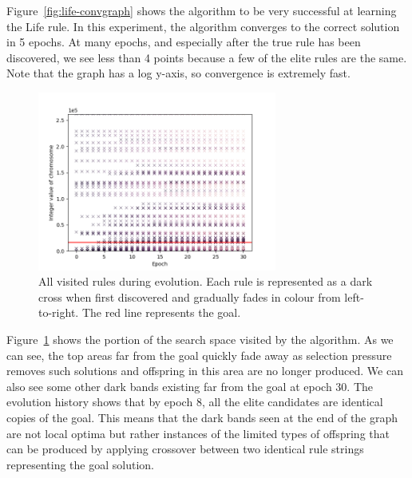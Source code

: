 Figure~\ref{fig:life-convgraph} shows the algorithm to be very successful at learning the Life rule. In this experiment, the algorithm converges to the correct solution in 5 epochs. At many epochs, and especially after the true rule has been discovered, we see less than 4 points because a few of the elite rules are the same. Note that the graph has a log y-axis, so convergence is extremely fast.\\

\begin{figure}[!h]
\centering
\includegraphics[width=0.7\textwidth]{images/life_like_eval/life-searchgraph.png}
\caption{All visited rules during evolution. Each rule is represented as a dark cross when first discovered and gradually fades in colour from left-to-right. The red line represents the goal.}
\label{fig:life-searchgraph}
\end{figure}

Figure~\ref{fig:life-searchgraph} shows the portion of the search space visited by the algorithm. As we can see, the top areas far from the goal quickly fade away as selection pressure removes such solutions and offspring in this area are no longer produced. We can also see some other dark bands existing far from the goal at epoch 30. The evolution history shows that by epoch 8, all the elite candidates are identical copies of the goal. This means that the dark bands seen at the end of the graph are not local optima but rather instances of the limited types of offspring that can be produced by applying crossover between two identical rule strings representing the goal solution.

